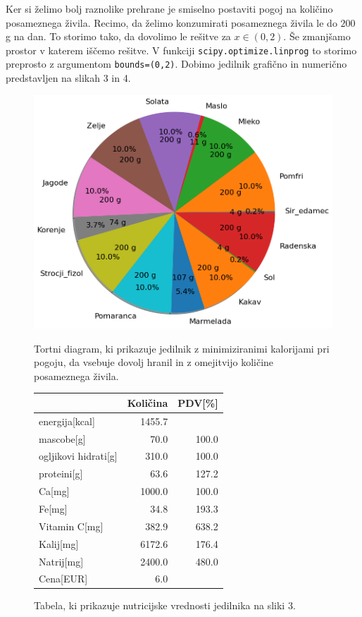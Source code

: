 \documentclass[slovene,11pt,a4paper]{article}
\begin{document}
\newpage

Ker si želimo bolj raznolike prehrane je smiselno postaviti pogoj na količino posameznega živila. Recimo, da želimo konzumirati posameznega živila le do $200\,$g na dan. To storimo tako, da dovolimo le rešitve za $x\in(0,2)$. Še zmanjšamo prostor v katerem iščemo rešitve. V funkciji \texttt{scipy.optimize.linprog} to storimo preprosto z argumentom \texttt{bounds=(0,2)}. Dobimo jedilnik grafično in numerično predstavljen na slikah 3 in 4.

\begin{figure}[h!]
  \centering
  \begin{minipage}[h]{0.56\textwidth}
    \includegraphics[width=\textwidth]{piechart2.png}
    \caption{Tortni diagram, ki prikazuje jedilnik z minimiziranimi kalorijami pri pogoju, da 				vsebuje dovolj hranil in z omejitvijo količine posameznega živila.}
  \end{minipage}
  \hfill
  \begin{minipage}[h]{0.42\textwidth}
	\begin{tabular}{lrr}
		\toprule
		{} &  Količina &  PDV[\%] \\
		\midrule
		energija[kcal]       &    1455.7 &         \\
		mascobe[g]           &      70.0 &   100.0 \\
		ogljikovi hidrati[g] &     310.0 &   100.0 \\
		proteini[g]          &      63.6 &   127.2 \\
		Ca[mg]               &    1000.0 &   100.0 \\
		Fe[mg]               &      34.8 &   193.3 \\
		Vitamin C[mg]        &     382.9 &   638.2 \\
		Kalij[mg]            &    6172.6 &   176.4 \\
		Natrij[mg]           &    2400.0 &   480.0 \\
		Cena[EUR]            &       6.0 &         \\
		\bottomrule
	\end{tabular}
	\caption{Tabela, ki prikazuje nutricijske vrednosti jedilnika na sliki 3.}
  \end{minipage}
\end{figure}
\end{document}
